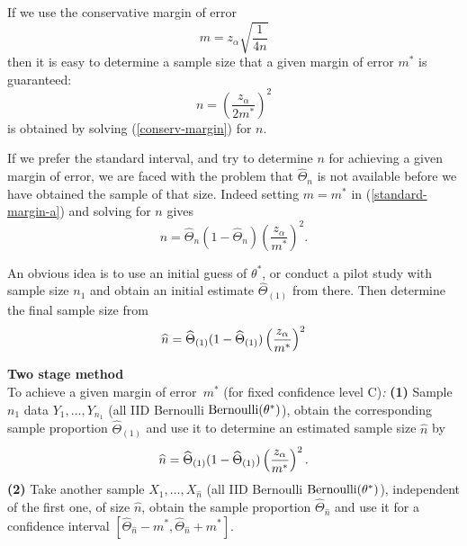 If we use the conservative margin of error 
\begin{equation}
m=z_{\alpha}\sqrt{\frac{1}{4n}}  \label{conserv-margin}
\end{equation}%
then it is easy to determine a sample size that a given margin of error $%
m^{\ast }$ is guaranteed: 
\begin{equation}
n=\left( \frac{z_{\alpha}}{2m^{\ast }}\right) ^{2}
\label{sample-size-determin-1}
\end{equation}%
is obtained by solving (\ref{conserv-margin}) for $n$.

If we prefer the standard interval, and try to determine $n$ for achieving a
given margin of error, we are faced with the problem that $\widehat{\Theta}_{n}$ is
not available before we have obtained the sample of that size. Indeed
setting $m=m^{\ast }$ in (\ref{standard-margin-a}) and solving for $n$ gives 
\begin{equation*}
n=\widehat{\Theta}_{n}(1-\widehat{\Theta}_{n})\left( \frac{z_{\alpha}}{m^{\ast }}%
\right) ^{2}.
\end{equation*}

An obvious idea is to use an initial guess of $\theta^*$, or conduct a pilot study
with sample size $n_{1}$ and obtain an initial estimate $\widehat{\Theta}_{(1)}$ from
there. Then determine the final sample size from 
\begin{equation*}
\widehat{n}=\widehat{\Theta}_{(1)}(1-\widehat{\Theta}_{(1)})\left( \frac{z_{\alpha}}{%
m^{\ast }}\right) ^{2}
\end{equation*}

\begin{algorithm}[htbp]
\label{algo-2-stage}\textbf{Two stage method }\\To achieve a given margin
of error\textit{\ }$m^{\ast }$ (for fixed confidence level C)\textit{: }%
\bigskip \newline
\textbf{(1)} Sample $n_{1}$ data $Y_{1},\ldots ,Y_{n_{1}}$ (all IID
Bernoulli $\mbox{{\rm Bernoulli}}(\theta^*)$), obtain the corresponding sample proportion $%
\widehat{\Theta}_{(1)}$ and use it to determine an estimated sample size $\widehat{n}$ by 
\begin{equation*}
\widehat{n}=\widehat{\Theta}_{(1)}(1-\widehat{\Theta}_{(1)})\left( \frac{z_{\alpha}}{%
m^{\ast }}\right) ^{2}.
\end{equation*}%
\bigskip \textbf{(2) }Take another sample $X_{1},\ldots ,X_{\widehat{n}}$ (all
IID Bernoulli $\mbox{{\rm Bernoulli}}(\theta^*)$), independent of the first one, of size $%
\widehat{n}$, obtain the sample proportion $\widehat{\Theta}_{\widehat{n}}$ and use it for a
confidence interval $\left[ \widehat{\Theta}_{\widehat{n}}-m^{\ast },\widehat{\Theta}_{\widehat{n}%
}+m^{\ast }\right] .$ \bigskip
\end{algorithm}

